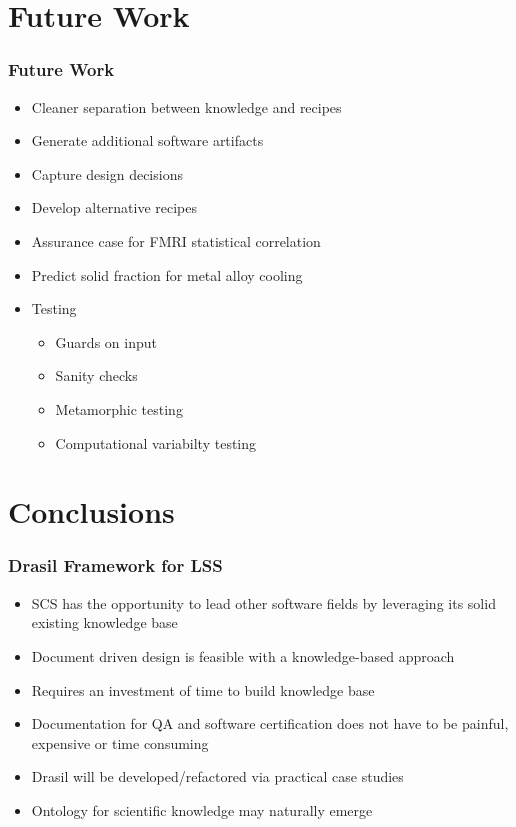\documentclass{beamer}
\begin{document}
\hoffset=0in %


\section[Future Work]{Future Work}


\begin{frame}

\frametitle{Future Work}

\begin{itemize}
\item Cleaner separation between knowledge and recipes
\item Generate additional software artifacts
\item Capture design decisions
\item Develop alternative recipes
\item Assurance case for FMRI statistical correlation
\item Predict solid fraction for metal alloy cooling
\item Testing
\begin{itemize}
\item Guards on input
\item Sanity checks
\item Metamorphic testing
\item Computational variabilty testing
\end{itemize}
\end{itemize}

\end{frame}


\section[Conclusions]{Conclusions}


\begin{frame}

\frametitle{Drasil Framework for LSS}

\begin{itemize}
\item SCS has the opportunity to lead other software fields by leveraging its
  solid existing knowledge base
\item Document driven design is feasible with a knowledge-based approach
\item Requires an investment of time to build knowledge base
\item Documentation for QA and software certification does not have to be
  painful, expensive or time consuming
\item Drasil will be developed/refactored via practical case studies
\item Ontology for scientific knowledge may naturally emerge
\end{itemize}
\end{frame}
\end{document}
